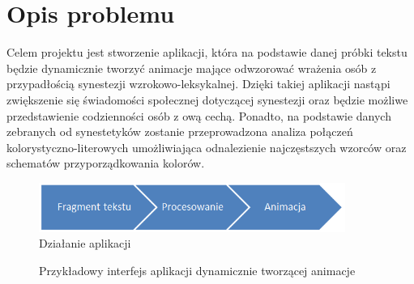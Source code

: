 \documentclass[12pt]{article}
\begin{document}
\section{Opis problemu}
	Celem projektu jest stworzenie aplikacji, która na podstawie danej próbki tekstu będzie dynamicznie tworzyć animacje mające odwzorować wrażenia osób z przypadłością synestezji wzrokowo-leksykalnej. Dzięki takiej aplikacji nastąpi zwiększenie się świadomości społecznej dotyczącej synestezji oraz będzie możliwe przedstawienie codzienności osób z ową cechą. Ponadto, na podstawie danych zebranych od synestetyków zostanie przeprowadzona analiza połączeń kolorystyczno-literowych umożliwiająca odnalezienie najczęstszych wzorców oraz schematów przyporządkowania kolorów.
\begin{figure}[ht!]
	\centering
	\includegraphics[width=10cm]{Capture.PNG}
	\caption{Działanie aplikacji}
\end{figure} 
\begin{figure}[ht!]
	\centering
	\caption{Przykładowy interfejs aplikacji dynamicznie tworzącej animacje}
\end{figure}
\pagebreak
\end{document}
